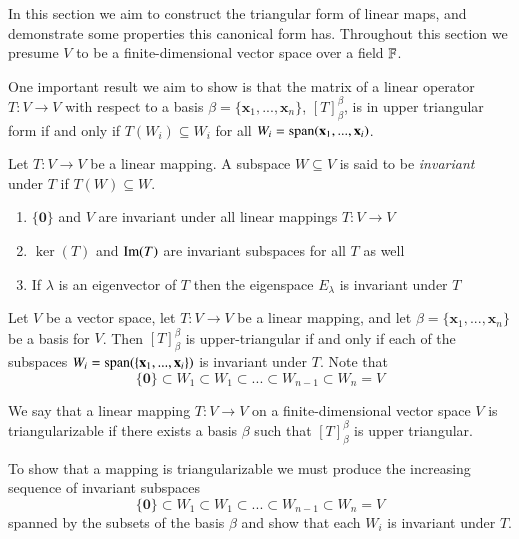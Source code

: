 \documentclass[12pt, a4paper, oneside, openright, titlepage]{book}
\newcommand{\mb}[1]{\mathbf{#1}}
\begin{document}
In this section we aim to construct the triangular form of linear maps, and demonstrate some properties this canonical form has. Throughout this section we presume $V$ to be a finite-dimensional vector space over a field $\mathbb F$. 


One important result we aim to show is that the matrix of a linear operator $T:V \rightarrow V$ with respect to a basis $\beta = \{\mb x_1,...,\mb x_n\}$, $[T]_{\beta}^{\beta}$, is in upper triangular form if and only if $T(W_i) \subseteq W_i$ for all $W_i = \spn(\mb x_1,...,\mb x_i)$.

\begin{defn}
    Let $T:V \rightarrow V$ be a linear mapping. A subspace $W \subseteq V$ is said to be \emph{invariant} under $T$ if $T(W) \subseteq W$.
\end{defn}

\begin{eg}
    \begin{enumerate}[label = \alph*]
        \item $\{\mb 0\}$ and $V$ are invariant under all linear mappings $T:V\rightarrow V$
        \item $\ker(T)$ and $\operatorname{Im}(T)$ are invariant subspaces for all $T$ as well
        \item If $\lambda$ is an eigenvector of $T$ then the eigenspace $E_{\lambda}$ is invariant under $T$
    \end{enumerate}
\end{eg}

\begin{prop}
    Let $V$ be a vector space, let $T:V\rightarrow V$ be a linear mapping, and let $\beta = \{\mb x_1,...,\mb x_n\}$ be a basis for $V$. Then $[T]_{\beta}^{\beta}$ is upper-triangular if and only if each of the subspaces $W_i = \spn(\{\mb x_1,..., \mb x_i\})$ is invariant under $T$. Note that $$\{\mb 0\} \subset W_1 \subset W_1 \subset ... \subset W_{n-1} \subset W_n = V$$
\end{prop}

\begin{defn}
    We say that a linear mapping $T:V \rightarrow V$ on a finite-dimensional vector space $V$ is triangularizable if there exists a basis $\beta$ such that $[T]_{\beta}^{\beta}$ is upper triangular.
\end{defn}


\begin{rmk}
    To show that a mapping is triangularizable we must produce the increasing sequence of invariant subspaces $$\{\mb 0\} \subset W_1 \subset W_1 \subset ... \subset W_{n-1} \subset W_n = V$$
    spanned by the subsets of the basis $\beta$ and show that each $W_i$ is invariant under $T$.
\end{rmk}
\end{document}
